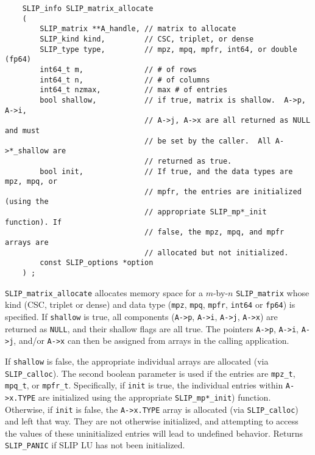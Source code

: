 \documentclass[12pt]{article}
\theoremstyle{definition}
\begin{document}
\begin{mdframed}[userdefinedwidth=6in]
{\footnotesize
\begin{verbatim}
    SLIP_info SLIP_matrix_allocate
    (
        SLIP_matrix **A_handle, // matrix to allocate
        SLIP_kind kind,         // CSC, triplet, or dense
        SLIP_type type,         // mpz, mpq, mpfr, int64, or double (fp64)
        int64_t m,              // # of rows
        int64_t n,              // # of columns
        int64_t nzmax,          // max # of entries
        bool shallow,           // if true, matrix is shallow.  A->p, A->i,
                                // A->j, A->x are all returned as NULL and must
                                // be set by the caller.  All A->*_shallow are
                                // returned as true.
        bool init,              // If true, and the data types are mpz, mpq, or
                                // mpfr, the entries are initialized (using the
                                // appropriate SLIP_mp*_init function). If
                                // false, the mpz, mpq, and mpfr arrays are
                                // allocated but not initialized.
        const SLIP_options *option
    ) ;
\end{verbatim}
} \end{mdframed}

\verb|SLIP_matrix_allocate| allocates memory space for a $m$-by-$n$
\verb|SLIP_matrix| whose kind (CSC, triplet or dense) and data type
(\verb|mpz|, \verb|mpq|, \verb|mpfr|, \verb|int64| or \verb|fp64|) is
specified. If \verb|shallow| is true, all components (\verb|A->p|, \verb|A->i|,
\verb|A->j|, \verb|A->x|) are returned as \verb|NULL|, and their shallow flags
are all true.  The pointers \verb|A->p|, \verb|A->i|, \verb|A->j|,
and/or \verb|A->x| can then be assigned from arrays in the calling application.

If \verb|shallow| is false, the appropriate individual arrays are allocated
(via \verb|SLIP_calloc|). The second boolean parameter is used if the entries
are \verb|mpz_t|, \verb|mpq_t|, or \verb|mpfr_t|. Specifically, if \verb|init|
is true, the individual entries within \verb|A->x.TYPE| are initialized using
the appropriate \verb|SLIP_mp*_init|) function. Otherwise, if \verb|init| is
false, the \verb|A->x.TYPE| array is allocated (via \verb|SLIP_calloc|) and
left that way.  They are not otherwise initialized, and attempting to access
the values of these uninitialized entries will lead to undefined behavior.
Returns \verb|SLIP_PANIC| if SLIP LU has not been initialized.
\end{document}
